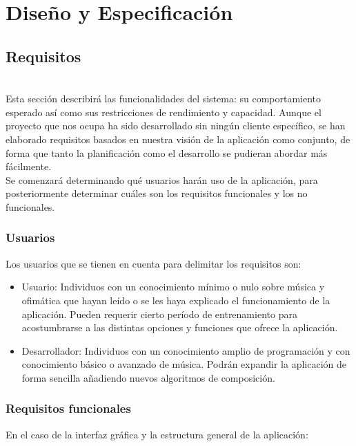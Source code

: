 \chapter{Diseño y Especificación}


\section{Requisitos}
\\
	Esta sección describirá las funcionalidades del sistema: su comportamiento esperado así como sus restricciones de rendimiento y capacidad. Aunque el proyecto que nos ocupa ha sido desarrollado sin ningún cliente específico, se han elaborado requisitos basados en nuestra visión de la aplicación como conjunto, de forma que tanto la planificación como el desarrollo se pudieran abordar más fácilmente.\\
	
	Se comenzará determinando qué usuarios harán uso de la aplicación, para posteriormente determinar cuáles son los requisitos funcionales y los no funcionales.
	
	\subsection{Usuarios}
	
	Los usuarios que se tienen en cuenta para delimitar los requisitos son:
	
	\begin{itemize}
		\item Usuario: Individuos con un conocimiento mínimo o nulo sobre música y ofimática que hayan leído o se les haya explicado el funcionamiento de la aplicación. Pueden requerir cierto período de entrenamiento para acostumbrarse a las distintas opciones y funciones que ofrece la aplicación.
		\item Desarrollador: Individuos con un conocimiento amplio de programación y con conocimiento básico o avanzado de música. Podrán expandir la aplicación de forma sencilla añadiendo nuevos algoritmos de composición.
		
	\end{itemize}

	\subsection{Requisitos funcionales}
	
	En el caso de la interfaz gráfica y la estructura general de la aplicación:

